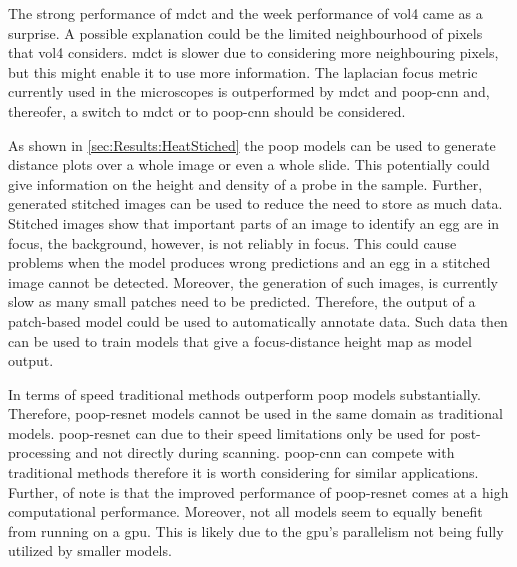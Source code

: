 The strong performance of \ac{mdct} and the week performance of \ac{vol4} came as a surprise. A possible explanation could be the limited neighbourhood of pixels that \ac{vol4} considers. \Ac{mdct} is slower due to considering more neighbouring pixels, but this might enable it to use more information. The \Ac{laplacian} focus metric currently used in the microscopes is outperformed by \ac{mdct} and \ac{poop}-\ac{cnn} and, thereofer, a switch to \ac{mdct} or to \ac{poop}-\ac{cnn} should be considered.

As shown in \autoref{sec:Results:HeatStiched} the \ac{poop} models can be used to generate distance plots over a whole image or even a whole slide. This potentially could give information on the height and density of a probe in the sample. Further, generated stitched images can be used to reduce the need to store as much data. Stitched images show that important parts of an image to identify an egg are in focus, the background, however, is not reliably in focus. This could cause problems when the model produces wrong predictions and an egg in a stitched image cannot be detected. Moreover, the generation of such images, is currently slow as many small patches need to be predicted. Therefore, the output of a patch-based model could be used to automatically annotate data. Such data then can be used to train models that give a focus-distance height map as model output.

In terms of speed traditional methods outperform \ac{poop} models substantially. Therefore, \ac{poop}-\ac{resnet} models cannot be used in the same domain as traditional models. \Ac{poop}-\ac{resnet} can due to their speed limitations only be used for post-processing and not directly during scanning. \Ac{poop}-\ac{cnn} can compete with traditional methods therefore it is worth considering for similar applications. Further, of note is that the improved performance of \Ac{poop}-\ac{resnet} comes at a high computational performance. Moreover, not all models seem to equally benefit from running on a \ac{gpu}. This is likely due to the \ac{gpu}'s parallelism not being fully utilized by smaller models.
